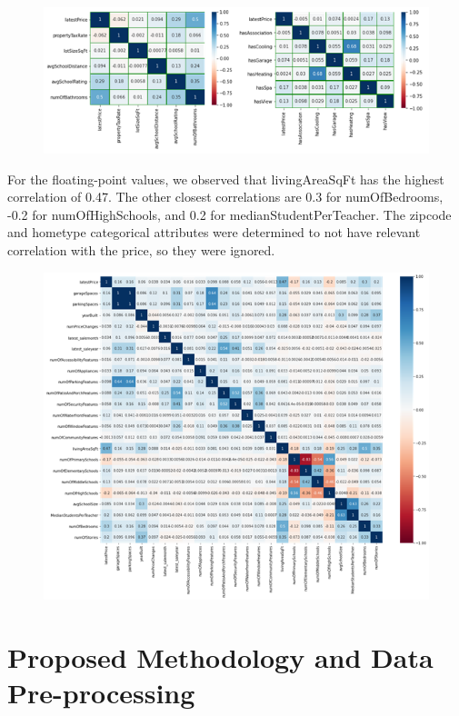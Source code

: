 \documentclass[12pt]{article}
\begin{document}
	\begin{figure}[H]
		\label{fig:fig2}
		\includegraphics[width=1\linewidth]{fig2}
	\end{figure}
	
	For the floating-point values, we observed that livingAreaSqFt has the highest correlation of 0.47. The other closest correlations are 0.3 for numOfBedrooms, -0.2 for numOfHighSchools, and 0.2 for medianStudentPerTeacher. The zipcode and hometype categorical attributes were determined to not have relevant correlation with the price, so they were ignored.
	
	\begin{figure}[H]
		\label{fig:fig3}
		\includegraphics[width=1\linewidth]{fig3}
	\end{figure}
	
	\section{Proposed Methodology and Data Pre-processing}
	
\end{document}
